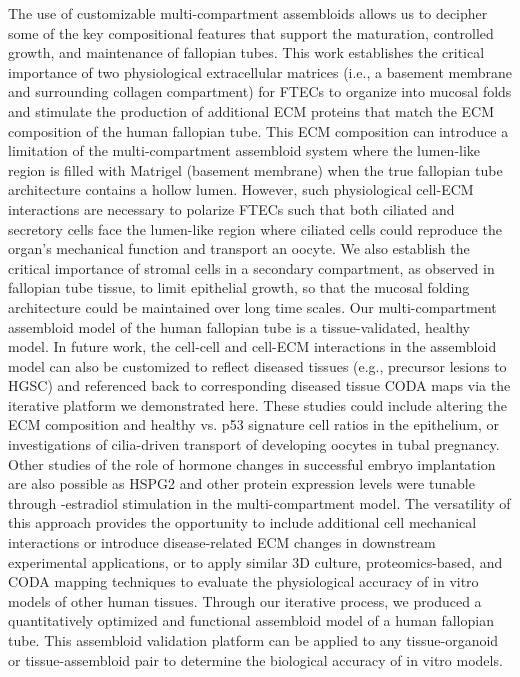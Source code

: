 \begin{refsection}
    The use of customizable multi-compartment assembloids allows us to decipher some of the key compositional features that support the maturation, controlled growth, and maintenance of fallopian tubes. This work establishes the critical importance of two physiological extracellular matrices (i.e., a basement membrane and surrounding collagen compartment)\cite{wheeler1982a,popescu2005a} for FTECs to organize into mucosal folds and stimulate the production of additional ECM proteins that match the ECM composition of the human fallopian tube\cite{shao2023a}. This ECM composition can introduce a limitation of the multi-compartment assembloid system where the lumen-like region is filled with Matrigel (basement membrane) when the true fallopian tube architecture contains a hollow lumen. However, such physiological cell-ECM interactions are necessary to polarize FTECs such that both ciliated and secretory cells face the lumen-like region\cite{popescu2005a,kessler2015a} where ciliated cells could reproduce the organ’s mechanical function and transport an oocyte\cite{yuan2021a,suarez2021a,wanggren2008a}. We also establish the critical importance of stromal cells in a secondary compartment, as observed in fallopian tube tissue\cite{wheeler1982a}, to limit epithelial growth, so that the mucosal folding architecture could be maintained over long time scales. 
    Our multi-compartment assembloid model of the human fallopian tube is a tissue-validated, healthy model. In future work, the cell-cell and cell-ECM interactions in the assembloid model can also be customized to reflect diseased tissues (e.g., precursor lesions to HGSC\cite{kuhn2012a}) and referenced back to corresponding diseased tissue CODA maps via the iterative platform we demonstrated here.  These studies could include altering the ECM composition\cite{rentchler2019a} and healthy vs. p53 signature cell ratios in the epithelium\cite{shih2021a}, or investigations of cilia-driven transport of developing oocytes in tubal pregnancy\cite{shao2010a,chua2017a}.  Other studies of the role of hormone changes in successful embryo implantation are also possible as HSPG2 and other protein expression levels were tunable through \textbeta-estradiol stimulation in the multi-compartment model\cite{chen2023a,garcia2024a}.  The versatility of this approach provides the opportunity to include additional cell mechanical interactions or introduce disease-related ECM changes in downstream experimental applications, or to apply similar 3D culture, proteomics-based, and CODA mapping techniques to evaluate the physiological accuracy of in vitro models of other human tissues. Through our iterative process, we produced a quantitatively optimized and functional assembloid model of a human fallopian tube. This assembloid validation platform can be applied to any tissue-organoid or tissue-assembloid pair to determine the biological accuracy of in vitro models.
    

\end{refsection}
